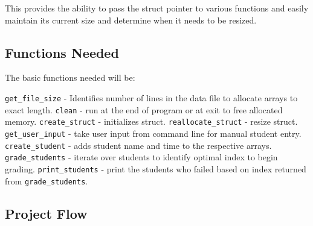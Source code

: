 This provides the ability to pass the struct pointer to various
functions and easily maintain its current size and determine when it
needs to be resized.

\hypertarget{functions-needed}{%
\subsection{Functions Needed}\label{functions-needed}}

The basic functions needed will be:

\begin{Shaded}
\begin{Highlighting}[]
\OperatorTok{();}
\OperatorTok{();}
\OperatorTok{();}
\OperatorTok{();}
\OperatorTok{();}
\OperatorTok{();}
\OperatorTok{();}
\OperatorTok{();}
\end{Highlighting}
\end{Shaded}

\texttt{get\_file\_size} - Identifies number of lines in the data file
to allocate arrays to exact length. \texttt{clean} - run at the end of
program or at exit to free allocated memory. \texttt{create\_struct} -
initializes struct. \texttt{reallocate\_struct} - resize struct.
\texttt{get\_user\_input} - take user input from command line for manual
student entry. \texttt{create\_student} - adds student name and time to
the respective arrays. \texttt{grade\_students} - iterate over students
to identify optimal index to begin grading. \texttt{print\_students} -
print the students who failed based on index returned from
\texttt{grade\_students}.

\hypertarget{project-flow}{%
\subsection{Project Flow}\label{project-flow}}

